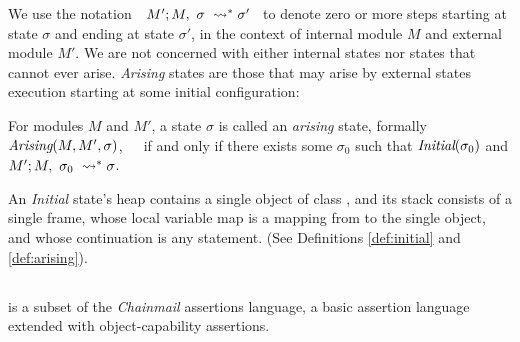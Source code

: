 We  use the notation\ \  $M' ; M,\ \sigma\ \leadsto^* \sigma'$ \ 
to denote
zero or more %
steps starting at state $\sigma$ and ending at state $\sigma'$, in the context of internal module 
$M$ and external module $M'$.
We are not concerned with either internal states nor states that cannot ever arise.
\emph{Arising} states are those that  may arise by external states execution
starting at some initial configuration:



\begin{definition}
\label{def:arising}
For   modules $M$ and  $M'$, a %
 state $\sigma$ is 
called an \emph{arising} state, formally \ \ \ $\textit{Arising}(M, M', \sigma)$,\ \ \ 
if and only if there exists some $\sigma_0$ such that $\textit{Initial}(\sigma_0)$ and
$M' ; M,\ \sigma_0\ \leadsto^* \sigma$.
\end{definition}

An \emph{Initial} state's heap
contains a single object of class , and
its  stack   consists of a single frame, whose local variable map is a
mapping from \prg{this} to the single object, and whose continuation is  any statement.
(See Definitions \ref{def:initial} and \ref{def:arising}).

\subsection{\SpecO}
\label{sub:SpecO}


\SpecO is a subset of the \emph{Chainmail} assertions language, \ie
a basic assertion language extended with
object-capability assertions. 


